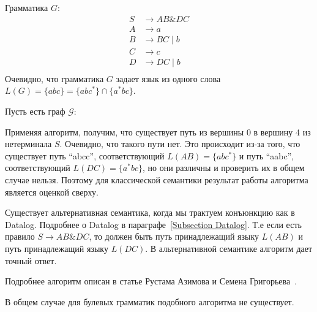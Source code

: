 \begin{example}
    Грамматика $G$:
    \begin{align*}
    S &\to AB \& DC \\ 
    A &\to a \\
    B &\to BC \mid b \\
    C &\to c \\
    D &\to DC \mid b \\
    \end{align*}
    Очевидно, что грамматика $G$ задает язык из одного слова $L(G) = \{abc\} = \{abc^*\} \cap \{a^* bc\}$.
    
    Пусть есть граф $\mathcal{G}$:
    \begin{center}
    \end{center}
    Применяя алгоритм, получим, что существует путь из вершины 0 в вершину 4 из нетерминала $S$. Очевидно, что такого пути нет. Это происходит из-за того, что существует путь ``abcc'', соответствующий $L(AB) = \{abc^*\}$ и путь ``aabc'', соответствующий $L(DC) = \{a^{*}bc\}$, но они различны и проверить их в общем случае нельзя. Поэтому для классической семантики результат работы алгоритма является оценкой сверху.
    
    Существует альтернативная семантика, когда мы трактуем конъюнкцию как в Datalog. Подробнее о Datalog в параграфе~\ref{Subsection Datalog}. Т.е если есть правило $S \to AB \& DC$, то должен быть путь принадлежащий языку $L(AB)$ и путь принадлежащий языку $L(DC)$. В альтернативной семантике алгоритм дает точный ответ.
\end{example}

Подробнее алгоритм описан в статье Рустама Азимова и Семена Григорьева~\cite{565CECD7E8F5C6063935B41DB41797AA37D53B04}.

В общем случае для булевых грамматик подобного алгоритма не существует.

